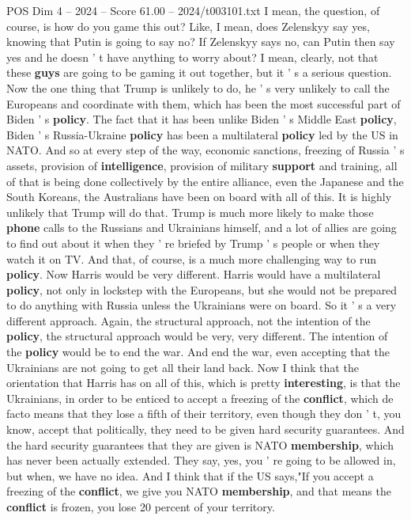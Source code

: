 \begin{textsample}{POS Dim 4 – 2024 – Score 61.00 – 2024/t003101.txt}
I mean, the question, of course, is how do you game this out?
Like, I mean, does Zelenskyy say yes, knowing that Putin is going to say no?
If Zelenskyy says no, can Putin then say yes and he doesn ' t have anything to worry about?
I mean, clearly, not that these \textbf{guys} are going to be gaming it out together, but it ' s a serious question.
Now the one thing that Trump is unlikely to do, he ' s very unlikely to call the Europeans and coordinate with them, which has been the most successful part of Biden ' s \textbf{policy}.
The fact that it has been unlike Biden ' s Middle East \textbf{policy}, Biden ' s Russia-Ukraine \textbf{policy} has been a multilateral \textbf{policy} led by the US in NATO.
And so at every step of the way, economic sanctions, freezing of Russia ' s assets, provision of \textbf{intelligence}, provision of military \textbf{support} and training, all of that is being done collectively by the entire alliance, even the Japanese and the South Koreans, the Australians have been on board with all of this.
It is highly unlikely that Trump will do that.
Trump is much more likely to make those \textbf{phone} calls to the Russians and Ukrainians himself, and a lot of allies are going to find out about it when they ' re briefed by Trump ' s people or when they watch it on TV.
And that, of course, is a much more challenging way to run \textbf{policy}.
Now Harris would be very different.
Harris would have a multilateral \textbf{policy}, not only in lockstep with the Europeans, but she would not be prepared to do anything with Russia unless the Ukrainians were on board.
So it ' s a very different approach.
Again, the structural approach, not the intention of the \textbf{policy}, the structural approach would be very, very different.
The intention of the \textbf{policy} would be to end the war.
And end the war, even accepting that the Ukrainians are not going to get all their land back.
Now I think that the orientation that Harris has on all of this, which is pretty \textbf{interesting}, is that the Ukrainians, in order to be enticed to accept a freezing of the \textbf{conflict}, which de facto means that they lose a fifth of their territory, even though they don ' t, you know, accept that politically, they need to be given hard security guarantees.
And the hard security guarantees that they are given is NATO \textbf{membership}, which has never been actually extended.
They say, yes, you ' re going to be allowed in, but when, we have no idea.
And I think that if the US says,"If you accept a freezing of the \textbf{conflict}, we give you NATO \textbf{membership}, and that means the \textbf{conflict} is frozen, you lose 20 percent of your territory.

\end{textsample}
